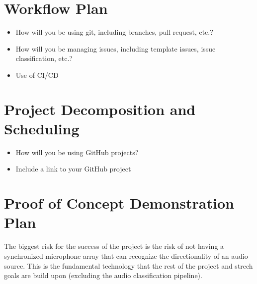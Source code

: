 \documentclass{article}
\begin{document}
\section{Workflow Plan}

\begin{itemize}
	\item How will you be using git, including branches, pull request, etc.?
	\item How will you be managing issues, including template issues, issue
	classification, etc.?
  \item Use of CI/CD
\end{itemize}

\section{Project Decomposition and Scheduling}

\begin{itemize}
  \item How will you be using GitHub projects?
  \item Include a link to your GitHub project
\end{itemize}


\section{Proof of Concept Demonstration Plan}


\hspace{1cm}

The biggest risk for the success of the project is the risk of not having a synchronized microphone array that can recognize the directionality of an audio source.
This is the fundamental technology that the rest of the project and strech goals are build upon (excluding the audio classification pipeline).
\end{document}
